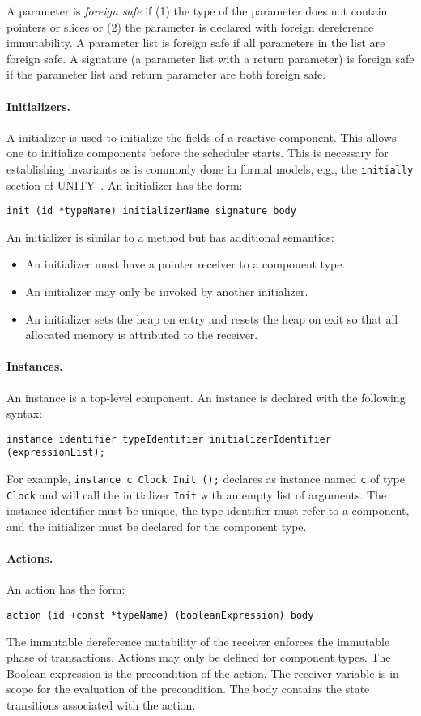 A parameter is \emph{foreign safe} if (1) the type of the parameter does not contain pointers or slices or (2) the parameter is declared with foreign dereference immutability.
A parameter list is foreign safe if all parameters in the list are foreign safe.
A signature (a parameter list with a return parameter) is foreign safe if the parameter list and return parameter are both foreign safe.

\paragraph{Initializers.}
A initializer is used to initialize the fields of a reactive component.
This allows one to initialize components before the scheduler starts.
This is necessary for establishing invariants as is commonly done in formal models, e.g., the \verb+initially+ section of UNITY~\cite{chandy1989parallel}.
An initializer has the form:
\begin{verbatim}
init (id *typeName) initializerName signature body
\end{verbatim}
An initializer is similar to a method but has additional semantics:
\begin{itemize}
\item An initializer must have a pointer receiver to a component type.
\item An initializer may only be invoked by another initializer.
\item An initializer sets the heap on entry and resets the heap on exit so that all allocated memory is attributed to the receiver.
\end{itemize}

\paragraph{Instances.}
An instance is a top-level component.
An instance is declared with the following syntax:
\begin{verbatim}
instance identifier typeIdentifier initializerIdentifier (expressionList);
\end{verbatim}
For example, \verb+instance c Clock Init ();+ declares as instance named \verb+c+ of type \verb+Clock+ and will call the initializer \verb+Init+ with an empty list of arguments.
The instance identifier must be unique, the type identifier must refer to a component, and the initializer must be declared for the component type.

\paragraph{Actions.}
An action has the form:
\begin{verbatim}
action (id +const *typeName) (booleanExpression) body
\end{verbatim}
The immutable dereference mutability of the receiver enforces the immutable phase of transactions.
Actions may only be defined for component types.
The Boolean expression is the precondition of the action.
The receiver variable is in scope for the evaluation of the precondition.
The body contains the state transitions associated with the action.

